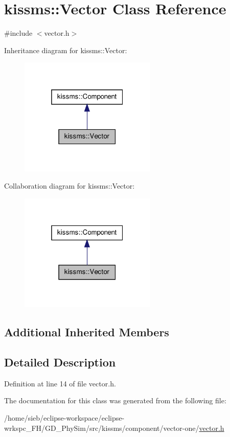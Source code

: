 \hypertarget{classkissms_1_1_vector}{\section{kissms\-:\-:Vector Class Reference}
\label{classkissms_1_1_vector}
}


{\ttfamily \#include $<$vector.\-h$>$}



Inheritance diagram for kissms\-:\-:Vector\-:
\nopagebreak
\begin{figure}[H]
\begin{center}
\leavevmode
\includegraphics[width=184pt]{classkissms_1_1_vector__inherit__graph}
\end{center}
\end{figure}


Collaboration diagram for kissms\-:\-:Vector\-:
\nopagebreak
\begin{figure}[H]
\begin{center}
\leavevmode
\includegraphics[width=184pt]{classkissms_1_1_vector__coll__graph}
\end{center}
\end{figure}
\subsection*{Additional Inherited Members}


\subsection{Detailed Description}


Definition at line 14 of file vector.\-h.



The documentation for this class was generated from the following file\-:\begin{DoxyCompactItemize}
\item 
/home/sieb/eclipse-\/workspace/eclipse-\/wrkspc\-\_\-\-F\-H/\-G\-D\-\_\-\-Phy\-Sim/src/kissms/component/vector-\/one/\hyperlink{vector_8h}{vector.\-h}\end{DoxyCompactItemize}
